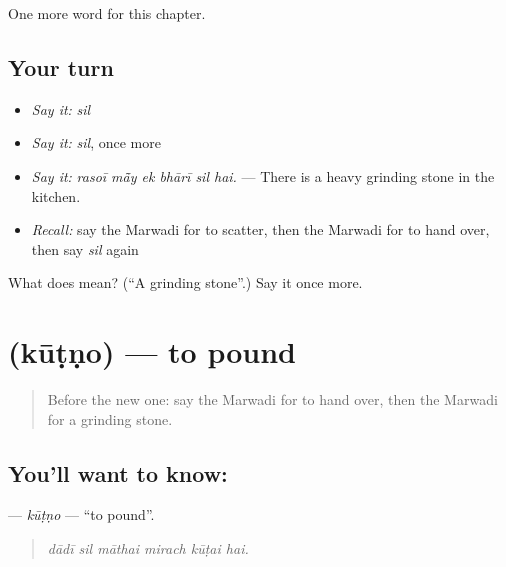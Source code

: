 \begin{grammarlens}[title={What you've built}]
One more word for this chapter.
\end{grammarlens}

\subsection*{Your turn}
\begin{itemize}
\raggedright
  \item \emph{Say it:} \emph{sil}
  \item \emph{Say it:} \emph{sil}, once more
  \item \emph{Say it:} \emph{rasoī mā̃y ek bhārī sil hai.} — There is a heavy grinding stone in the kitchen.
  \item \emph{Recall:} say the Marwadi for to scatter, then the Marwadi for to hand over, then say \emph{sil} again
\end{itemize}

\begin{tcolorbox}[breakable,colback=teal!4,colframe=teal!35!black,title={Before you move on}]
What does  mean? (\textquotedblleft{}A grinding stone\textquotedblright{}.) Say it once more.
\end{tcolorbox}
\section[\texorpdfstring{\mw{कूटणो} (kūṭṇo)}{कूटणो (kūṭṇo)}]{ (kūṭṇo) — to pound}

\label{lesson:MW-C179-kutno}



\begin{quote}
Before the new one: say the Marwadi for to hand over, then the Marwadi for a grinding stone.
\end{quote}

\subsection*{You'll want to know: }
\textbf{} — \emph{kūṭṇo} — \textquotedblleft{}to pound\textquotedblright{}.

\begin{quote}
     
\end{quote}

\begin{quote}
\emph{dādī sil māthai mirach kūṭai hai.}
\end{quote}

